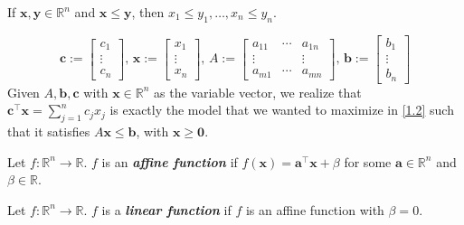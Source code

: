 \begin{remark}
    If $\bm{x},\bm{y}\in\mathbb{R}^n$ and $\bm{x}\leqslant \bm{y}$, then
    $x_1\leqslant  y_1, \ldots, x_n\leqslant y_n$.
\end{remark}

\begin{remark}
    \[
        \bm{c}:=\left[\begin{array}{c}{c_{1}} \\ {\vdots} \\ {c_{n}}\end{array}\right],\,
        \bm{x}:=\left[\begin{array}{c}{x_{1}} \\ {\vdots} \\ {x_{n}}\end{array}\right],\,
        A:=\left[\begin{array}{cccc}
                {a_{11}}  & \cdots & {a_{1 n}} \\
                \vdots    &        & \vdots    \\
                {a_{m 1}} & \cdots & {a_{m n}}
            \end{array}\right]
        ,\,
        \bm{b}:=\left[\begin{array}{c}{b_{1}} \\ {\vdots} \\ {b_{n}}\end{array}\right]
    \]
    Given $A,\bm{b},\bm{c}$ with $\bm{x}\in\mathbb{R}^n$ as the variable vector, we realize that
    $\bm{c}^\top  \bm{x}=\sum\limits_{j=1}^n c_jx_j$ is exactly the model that we wanted to maximize
    in \ref{1.2} such that it satisfies $A\bm{x}\leqslant \bm{b}$, with $\bm{x}\geqslant  \bm{0}$.
\end{remark}

\begin{defbox}
    \begin{definition}
        Let $f:\mathbb{R}^n\rightarrow\mathbb{R}$. $f$ is an \textbf{\emph{affine function}} if
        $f(\bm{x})=\bm{a}^\top \bm{x}+\beta$ for some $\bm{a}\in\mathbb{R}^n$ and $\beta\in\mathbb{R}$.
    \end{definition}
\end{defbox}

\begin{defbox}
    \begin{definition}
        Let $f:\mathbb{R}^n\rightarrow\mathbb{R}$. $f$ is a \textbf{\emph{linear function}} if
        $f$ is an affine function with $\beta=0$.
    \end{definition}
\end{defbox}

